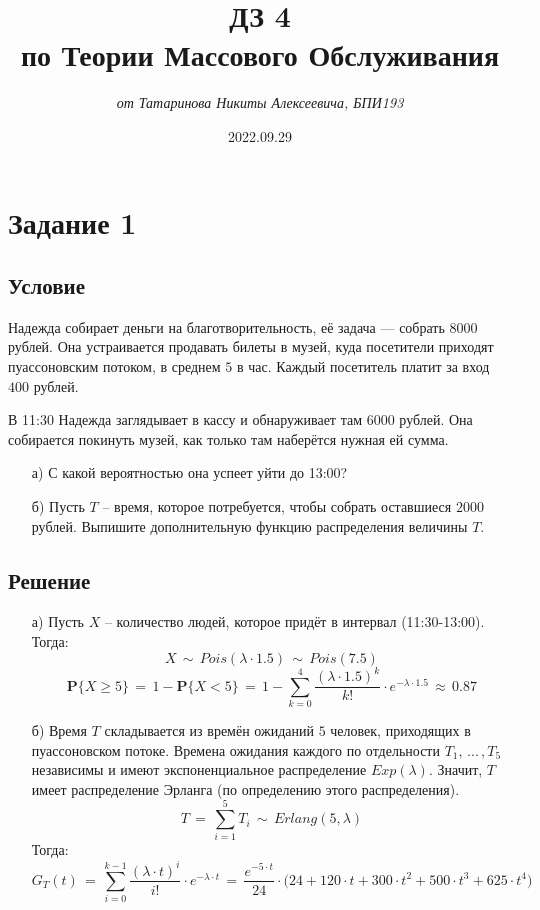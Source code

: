 \documentclass{article}
\title{\textbf{ДЗ 4\\по Теории Массового Обслуживания}}
\author{\textit{от Татаринова Никиты Алексеевича, БПИ193}}
\date{2022.09.29}
\begin{document}
\maketitle
\section*{Задание 1}
\subsection*{Условие}
Надежда собирает деньги на благотворительность, её задача — собрать $ 8000 $ рублей. Она устраивается продавать билеты в музей, куда посетители приходят пуассоновским потоком, в среднем $ 5 $ в час. Каждый посетитель платит за вход $ 400 $ рублей.\par
В 11:30 Надежда заглядывает в кассу и обнаруживает там $ 6000 $ рублей. Она собирается покинуть музей, как только там наберётся нужная ей сумма.
\begin{enumerate}
\item[а)] С какой вероятностью она успеет уйти до 13:00?
\item[б)] Пусть $ T $ -- время, которое потребуется, чтобы собрать оставшиеся $ 2000 $ рублей. Выпишите дополнительную функцию распределения величины $ T $.
\end{enumerate}
\subsection*{Решение}
\begin{enumerate}
\item[а)] Пусть $ X $ -- количество людей, которое придёт в интервал (11:30-13:00). Тогда:
\[ X \, \sim \, Pois(\lambda \! \cdot \! 1.5) \, \sim \, Pois(7.5) \]
\[ \mathbf{P} \big\{ X \! \geqslant \! 5 \big\} \, = \, 1 \! - \! \mathbf{P} \big\{ X \! < \! 5 \big\} \, = \, 1 \! - \! \sum\limits_{k=0}^4 \dfrac{(\lambda \! \cdot \! 1.5)^k}{k!} \! \cdot \! e^{-\lambda \cdot 1.5} \, \approx \, 0.87 \]
\item[б)] Время $ T $ складывается из времён ожиданий $ 5 $ человек, приходящих в пуассоновском потоке. Времена ожидания каждого по отдельности $ T_1, \, ... \, ,T_5 $ независимы и имеют экспоненциальное распределение $ Exp(\lambda) $. Значит, $ T $ имеет распределение Эрланга (по определению этого распределения).
\[ T \, = \, \sum\limits_{i=1}^5 T_i \, \sim \, Erlang(5,\lambda ) \]
Тогда:
\[ G_T(t) \, = \, \sum\limits_{i=0}^{k-1} \dfrac{(\lambda \! \cdot \! t)^i}{i!} \! \cdot \! e^{-\lambda \cdot t} \, = \, \dfrac{e^{-5 \cdot t}}{24} \! \cdot \! \big( 24 \! + \! 120 \! \cdot \! t \! + \! 300 \! \cdot \! t^2 \! + \! 500 \! \cdot \! t^3 \! + \! 625 \! \cdot \! t^4 \big) \]
\end{enumerate}
\end{document}
